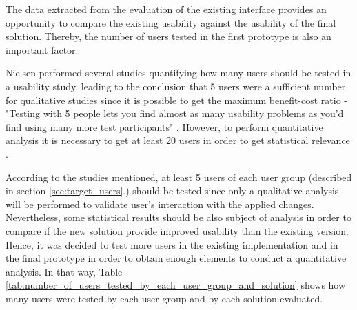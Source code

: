 The data extracted from the evaluation of the existing interface provides an opportunity to compare the existing usability against the usability of the final solution. Thereby, the number of users tested in the first prototype is also an important factor.

Nielsen performed several studies quantifying how many users should be tested in a usability study, leading to the conclusion that 5 users were a sufficient number for qualitative studies since it is possible to get the maximum benefit-cost ratio - "Testing with 5 people lets you find almost as many usability problems as you'd find using many more test participants" \cite{why_you_only_need_to_test_with_5_users} \cite{how_many_test_users_in_a_usability_study}. However, to perform quantitative analysis it is necessary to get at least 20 users in order to get statistical relevance \cite{how_many_test_users_in_a_usability_study}.

According to the studies mentioned, at least 5 users of each user group (described in section \ref{sec:target_users}.) should be tested since only a qualitative analysis will be performed to validate user's interaction with the applied changes. Nevertheless, some statistical results should be also subject of analysis in order to compare if the new solution provide improved usability than the existing version. Hence, it was decided to test more users in the existing implementation and in the final prototype in order to obtain enough elements to conduct a quantitative analysis. In that way, Table \ref{tab:number_of_users_tested_by_each_user_group_and_solution} shows how many users were tested by each user group and by each solution evaluated.

\begin{table}[tb]
	\caption{Number of users tested by each user group and by each solution evaluated}
	\label{tab:number_of_users_tested_by_each_user_group_and_solution}
\centering
{}
\end{table}

